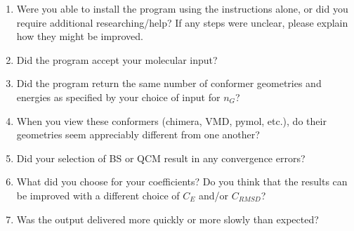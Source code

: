 \documentclass[12pt, titlepage]{article}
\begin{document}
\begin{enumerate}
	\item Were you able to install the program using the instructions alone, or 
	did you require additional researching/help? If any steps were unclear, 
	please explain how they might be improved.
	\item Did the program accept your molecular input?
	\item Did the program return the same number of conformer geometries and 
	energies as specified by your choice of input for $n_G$?
	\item When you view these conformers (chimera, VMD, pymol, etc.), do their 
	geometries seem appreciably different from one another?
	\item Did your selection of BS or QCM  result in any convergence errors?
	\item What did you choose for your coefficients? Do you think that the 
	results can be improved with a different choice of $C_E$ and/or $C_{RMSD}$?
	\item Was the output delivered more quickly or more slowly than expected?
	
\end{enumerate}
\end{document}
